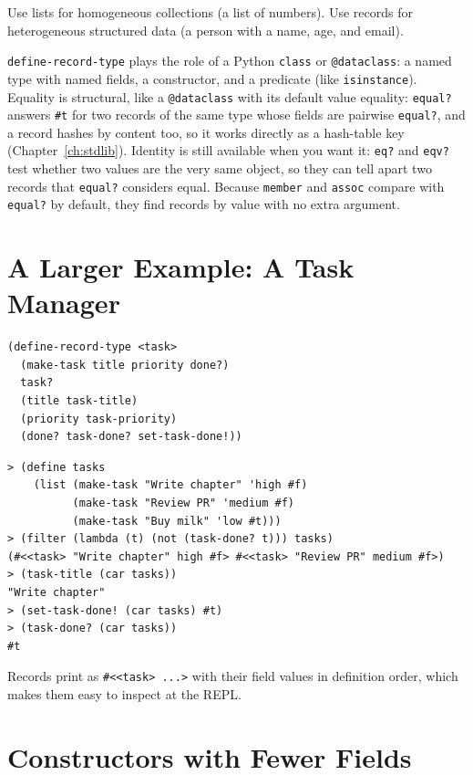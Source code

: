 Use lists for homogeneous collections (a list of numbers). Use records for heterogeneous structured data (a person with a name, age, and email).

\begin{note}
\texttt{define-record-type} plays the role of a Python \texttt{class} or \texttt{@dataclass}: a named type with named fields, a constructor, and a predicate (like \texttt{isinstance}). Equality is structural, like a \texttt{@dataclass} with its default value equality: \texttt{equal?} answers \texttt{\#t} for two records of the same type whose fields are pairwise \texttt{equal?}, and a record hashes by content too, so it works directly as a hash-table key (Chapter~\ref{ch:stdlib}). Identity is still available when you want it: \texttt{eq?} and \texttt{eqv?} test whether two values are the very same object, so they can tell apart two records that \texttt{equal?} considers equal. Because \texttt{member} and \texttt{assoc} compare with \texttt{equal?} by default, they find records by value with no extra argument.
\end{note}

\section{A Larger Example: A Task Manager}

\begin{lstlisting}
(define-record-type <task>
  (make-task title priority done?)
  task?
  (title task-title)
  (priority task-priority)
  (done? task-done? set-task-done!))
\end{lstlisting}

\begin{lstlisting}[style=repl]
> (define tasks
    (list (make-task "Write chapter" 'high #f)
          (make-task "Review PR" 'medium #f)
          (make-task "Buy milk" 'low #t)))
> (filter (lambda (t) (not (task-done? t))) tasks)
(#<<task> "Write chapter" high #f> #<<task> "Review PR" medium #f>)
> (task-title (car tasks))
"Write chapter"
> (set-task-done! (car tasks) #t)
> (task-done? (car tasks))
#t
\end{lstlisting}

Records print as \texttt{\#<<task> ...>} with their field values in definition order, which makes them easy to inspect at the REPL.

\section{Constructors with Fewer Fields}

